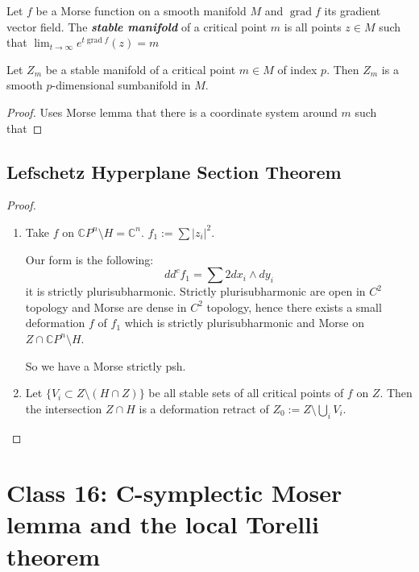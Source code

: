 \begin{defn}\leavevmode
	Let $f$ be a Morse function on a smooth manifold $M$ and $\operatorname{g r a d}f$ its gradient vector field. The \textit{\textbf{stable manifold}} of a critical point  $m$ is all points $z\in M$ such that $\lim_{t \to \infty} e^{t \operatorname{g r a d}f}(z)=m$
\end{defn}

\begin{prop}\leavevmode
	Let $Z_m$ be a stable manifold of a critical point $m \in M$ of index  $p$. Then $Z_m$ is a smooth $p$-dimensional sumbanifold in $M$.
\end{prop}

\begin{proof}\leavevmode
	Uses Morse lemma that there is a coordinate system around $m$ such that 
\end{proof}

\subsection{Lefschetz Hyperplane Section Theorem}

\begin{proof}\leavevmode
\begin{enumerate}[label=\textbf{Step \arabic*}]
	\item 	Take $f$ on $\mathbb{C}P^{n}\setminus H=\mathbb{C}^n$. $f_1:=\sum |z_i|^2$.

	Our form is the following:
	\[d d^cf_1=\sum 2dx_i\wedge dy_i\]
it is strictly plurisubharmonic. Strictly plurisubharmonic are open in $C^2$ topology and Morse are dense in $C^2$ topology, hence there exists a small deformation $f$ of $f_1$ which is strictly plurisubharmonic and Morse on $Z \cap \mathbb{C}P^{n}\setminus H$.

So we have a Morse strictly psh.

\item Let $\{V_i \subset Z\setminus (H\cap Z)\}$ be all stable sets of all critical points of $f$ on $Z$. Then the intersection $Z\cap H$ is a deformation retract of $Z_0:=Z\setminus \bigcup_{i} V_i$.
\end{enumerate}



\end{proof}

\section{Class 16: C-symplectic Moser lemma and the local Torelli theorem}

